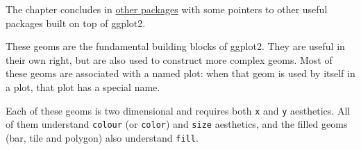 The chapter concludes in \hyperref[sec:elsewhere]{other packages} with
some pointers to other useful packages built on top of ggplot2.


These geoms are the fundamental building blocks of ggplot2. They are
useful in their own right, but are also used to construct more complex
geoms. Most of these geoms are associated with a named plot: when that
geom is used by itself in a plot, that plot has a special name.

Each of these geoms is two dimensional and requires both \texttt{x} and
\texttt{y} aesthetics. All of them understand \texttt{colour} (or
\texttt{color}) and \texttt{size} aesthetics, and the filled geoms (bar,
tile and polygon) also understand \texttt{fill}.

